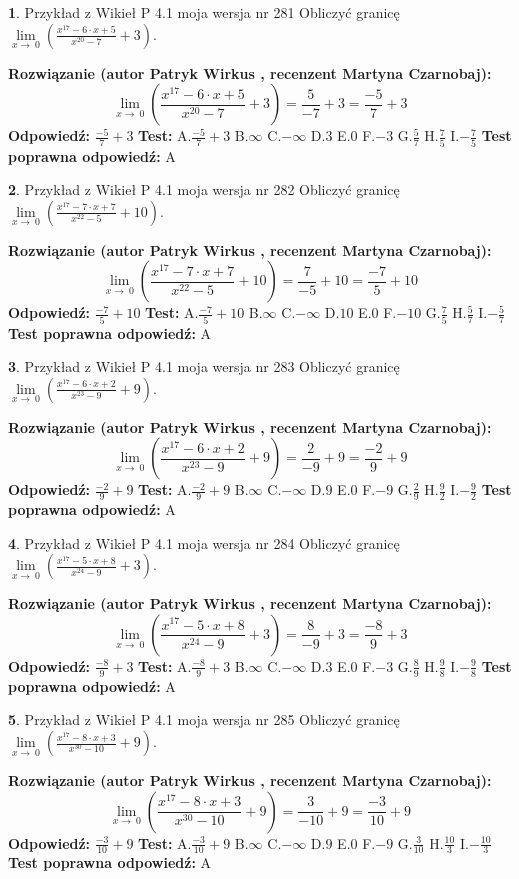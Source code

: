 \documentclass[12pt, a4paper]{article}
\theoremstyle{definition} %
\newtheorem{zad}{}
\newcommand{\zadStart}[1]{\begin{zad}#1\newline}
\newcommand{\zadStop}{\end{zad}}
\newcommand{\rozwStart}[2]{\noindent \textbf{Rozwiązanie (autor #1 , recenzent #2): }\newline}
\newcommand{\rozwStop}{\newline}
\newcommand{\odpStart}{\noindent \textbf{Odpowiedź:}\newline}
\newcommand{\odpStop}{\newline}
\newcommand{\testStart}{\noindent \textbf{Test:}\newline}
\newcommand{\testStop}{\newline}
\newcommand{\kluczStart}{\noindent \textbf{Test poprawna odpowiedź:}\newline}
\newcommand{\kluczStop}{\newline}
\begin{document}
\zadStart{Przykład z Wikieł P 4.1 moja wersja nr 281}
Obliczyć granicę $\lim\limits_{x\to\ 0}(\frac{x^{17}-6 \cdot x +5}{x^{20}-7}+3)$.
\zadStop
\rozwStart{Patryk Wirkus}{Martyna Czarnobaj}
$$\lim\limits_{x\to\ 0}(\frac{x^{17}-6 \cdot x +5}{x^{20}-7}+3)=\frac{5}{-7}+3=\frac{-5}{7}+3$$
\rozwStop
\odpStart
$\frac{-5}{7}+3$
\odpStop
\testStart
A.$\frac{-5}{7}+3$
B.$\infty$
C.$-\infty$
D.$3$
E.$0$
F.$-3$
G.$\frac{5}{7}$
H.$\frac{7}{5}$
I.$-\frac{7}{5}$
\testStop
\kluczStart
A
\kluczStop



\zadStart{Przykład z Wikieł P 4.1 moja wersja nr 282}
Obliczyć granicę $\lim\limits_{x\to\ 0}(\frac{x^{17}-7 \cdot x +7}{x^{22}-5}+10)$.
\zadStop
\rozwStart{Patryk Wirkus}{Martyna Czarnobaj}
$$\lim\limits_{x\to\ 0}(\frac{x^{17}-7 \cdot x +7}{x^{22}-5}+10)=\frac{7}{-5}+10=\frac{-7}{5}+10$$
\rozwStop
\odpStart
$\frac{-7}{5}+10$
\odpStop
\testStart
A.$\frac{-7}{5}+10$
B.$\infty$
C.$-\infty$
D.$10$
E.$0$
F.$-10$
G.$\frac{7}{5}$
H.$\frac{5}{7}$
I.$-\frac{5}{7}$
\testStop
\kluczStart
A
\kluczStop



\zadStart{Przykład z Wikieł P 4.1 moja wersja nr 283}
Obliczyć granicę $\lim\limits_{x\to\ 0}(\frac{x^{17}-6 \cdot x +2}{x^{23}-9}+9)$.
\zadStop
\rozwStart{Patryk Wirkus}{Martyna Czarnobaj}
$$\lim\limits_{x\to\ 0}(\frac{x^{17}-6 \cdot x +2}{x^{23}-9}+9)=\frac{2}{-9}+9=\frac{-2}{9}+9$$
\rozwStop
\odpStart
$\frac{-2}{9}+9$
\odpStop
\testStart
A.$\frac{-2}{9}+9$
B.$\infty$
C.$-\infty$
D.$9$
E.$0$
F.$-9$
G.$\frac{2}{9}$
H.$\frac{9}{2}$
I.$-\frac{9}{2}$
\testStop
\kluczStart
A
\kluczStop



\zadStart{Przykład z Wikieł P 4.1 moja wersja nr 284}
Obliczyć granicę $\lim\limits_{x\to\ 0}(\frac{x^{17}-5 \cdot x +8}{x^{24}-9}+3)$.
\zadStop
\rozwStart{Patryk Wirkus}{Martyna Czarnobaj}
$$\lim\limits_{x\to\ 0}(\frac{x^{17}-5 \cdot x +8}{x^{24}-9}+3)=\frac{8}{-9}+3=\frac{-8}{9}+3$$
\rozwStop
\odpStart
$\frac{-8}{9}+3$
\odpStop
\testStart
A.$\frac{-8}{9}+3$
B.$\infty$
C.$-\infty$
D.$3$
E.$0$
F.$-3$
G.$\frac{8}{9}$
H.$\frac{9}{8}$
I.$-\frac{9}{8}$
\testStop
\kluczStart
A
\kluczStop



\zadStart{Przykład z Wikieł P 4.1 moja wersja nr 285}
Obliczyć granicę $\lim\limits_{x\to\ 0}(\frac{x^{17}-8 \cdot x +3}{x^{30}-10}+9)$.
\zadStop
\rozwStart{Patryk Wirkus}{Martyna Czarnobaj}
$$\lim\limits_{x\to\ 0}(\frac{x^{17}-8 \cdot x +3}{x^{30}-10}+9)=\frac{3}{-10}+9=\frac{-3}{10}+9$$
\rozwStop
\odpStart
$\frac{-3}{10}+9$
\odpStop
\testStart
A.$\frac{-3}{10}+9$
B.$\infty$
C.$-\infty$
D.$9$
E.$0$
F.$-9$
G.$\frac{3}{10}$
H.$\frac{10}{3}$
I.$-\frac{10}{3}$
\testStop
\kluczStart
A
\kluczStop
\end{document}

